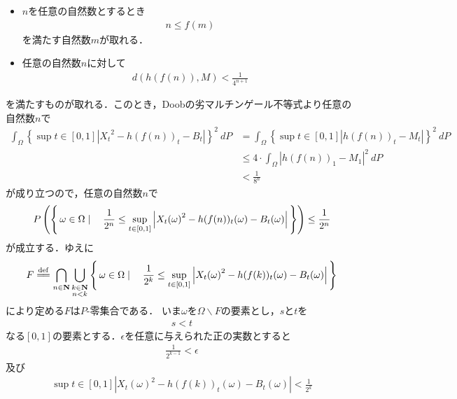 \begin{sketch}
\begin{description}
\begin{itemize}
					\item $n$を任意の自然数とするとき
						\begin{align}
							n \leq f(m)
						\end{align}
						を満たす自然数$m$が取れる．
						
					\item 任意の自然数$n$に対して
						\begin{align}
							d(h(f(n)),M) < \frac{1}{4^{n+1}}
						\end{align}
				\end{itemize}
				を満たすものが取れる．このとき，Doobの劣マルチンゲール不等式より任意の自然数$n$で
				\begin{align}
					\int_\Omega \left\{\sup{t \in [0,1]}{\left|{X_{t}}^{2} - h(f(n))_{t} - B_{t}\right|}\right\}^{2}\ dP
					&= \int_\Omega \left\{\sup{t \in [0,1]}{\left|h(f(n))_{t} - M_{t}\right|}\right\}^{2}\ dP \\
					&\leq 4 \cdot \int_\Omega \left|h(f(n))_{1} - M_{1}\right|^{2}\ dP \\
					&< \frac{1}{8^{n}}
				\end{align}
				が成り立つので，任意の自然数$n$で
				\begin{align}
					P\left(\left\{\, \omega \in \Omega \mid \quad 
					\frac{1}{2^{n}} \leq \operatorname*{sup}_{t \in [0,1]} \left|{X_{t}(\omega)}^{2} - h(f(n))_{t}(\omega) - B_{t}(\omega) \right|\, \right\}\right)
					\leq \frac{1}{2^{n}}
				\end{align}
				が成立する．ゆえに
				\begin{align}
					F \defeq \bigcap_{n \in \Natural} \bigcup_{\substack{k \in \Natural \\ n < k}} 
					\Set{\omega \in \Omega}{\frac{1}{2^{k}} \leq \sup{t \in [0,1]}{\left|{X_{t}(\omega)}^{2} - h(f(k))_{t}(\omega) - B_{t}(\omega) \right|}}
				\end{align}
				により定める$F$は$P$-零集合である．
				いま$\omega$を$\Omega \backslash F$の要素とし，$s$と$t$を
				\begin{align}
					s < t
				\end{align}
				なる$[0,1]$の要素とする．$\epsilon$を任意に与えられた正の実数とすると
				\begin{align}
					\frac{1}{2^{k-1}} < \epsilon
				\end{align}
				及び
				\begin{align}
					\sup{t \in [0,1]}{\left|{X_{t}(\omega)}^{2} - h(f(k))_{t}(\omega) - B_{t}(\omega)\right|} < \frac{1}{2^{k}}
				\end{align}

\end{description}
\end{sketch}
